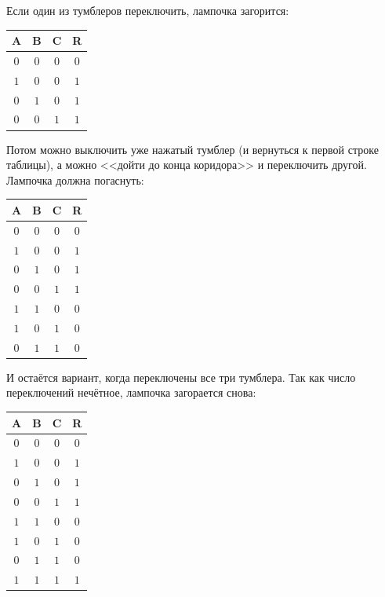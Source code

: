 Если один из тумблеров переключить, лампочка загорится:

\begin{center}
\begin{tabular}{|c|c|c|c|}
 \hline
 \textbf{A} & \textbf{B} & \textbf{C} & \textbf{R} \\ \hline
 $0$ & $0$ & $0$ & $0$ \\ \hline
 $1$ & $0$ & $0$ & $1$ \\ \hline
 $0$ & $1$ & $0$ & $1$ \\ \hline
 $0$ & $0$ & $1$ & $1$ \\ \hline
\end{tabular}
\end{center}

Потом можно выключить уже нажатый тумблер (и вернуться к первой строке таблицы),
а можно <<дойти до конца коридора>> и переключить другой. Лампочка должна погаснуть:

\begin{center}
\begin{tabular}{|c|c|c|c|}
 \hline
 \textbf{A} & \textbf{B} & \textbf{C} & \textbf{R} \\ \hline
 $0$ & $0$ & $0$ & $0$ \\ \hline
 $1$ & $0$ & $0$ & $1$ \\ \hline
 $0$ & $1$ & $0$ & $1$ \\ \hline
 $0$ & $0$ & $1$ & $1$ \\ \hline
 $1$ & $1$ & $0$ & $0$ \\ \hline
 $1$ & $0$ & $1$ & $0$ \\ \hline
 $0$ & $1$ & $1$ & $0$ \\ \hline
\end{tabular}
\end{center}

И остаётся вариант, когда переключены все три тумблера. Так как число переключений нечётное,
лампочка загорается снова:

\begin{center}
\begin{tabular}{|c|c|c|c|}
 \hline
 \textbf{A} & \textbf{B} & \textbf{C} & \textbf{R} \\ \hline
 $0$ & $0$ & $0$ & $0$ \\ \hline
 $1$ & $0$ & $0$ & $1$ \\ \hline
 $0$ & $1$ & $0$ & $1$ \\ \hline
 $0$ & $0$ & $1$ & $1$ \\ \hline
 $1$ & $1$ & $0$ & $0$ \\ \hline
 $1$ & $0$ & $1$ & $0$ \\ \hline
 $0$ & $1$ & $1$ & $0$ \\ \hline
 $1$ & $1$ & $1$ & $1$ \\ \hline
\end{tabular}
\end{center}

